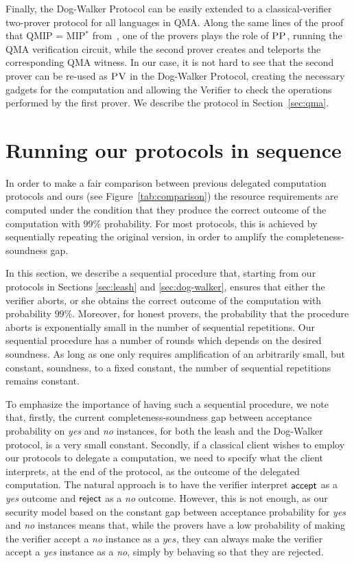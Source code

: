 Finally, the Dog-Walker Protocol can be easily extended to a classical-verifier  two-prover protocol for all languages in QMA. 
Along the same lines of the proof that QMIP = MIP$^*$ from~\cite{reichardt2012classical}, one of the provers plays the role of $\textsc{PP}$, running the  QMA verification circuit, while the second prover creates and teleports the corresponding QMA witness. In our case, it is not hard to see that the second prover can be  re-used as $\textsc{PV}$ in the Dog-Walker Protocol, creating the necessary gadgets for the computation and allowing the Verifier to check the operations performed by the first prover.  We describe the protocol in Section~\ref{sec:qma}.




\section{Running our protocols in sequence}
\label{sec:sequential}

In order to make a fair comparison between previous delegated computation protocols and ours (see Figure~\ref{tab:comparison}) the resource requirements are computed under the condition that they produce the correct outcome of the computation with $99\%$ probability. For most protocols, this is achieved by sequentially repeating the original version, in order to amplify the completeness-soundness gap. 

In this section, we describe a sequential procedure that, starting from our protocols in Sections \ref{sec:leash} and \ref{sec:dog-walker}, ensures that either the verifier aborts, or she obtains the correct outcome of the computation with probability $99\%$. Moreover, for honest provers, the probability that the procedure aborts is exponentially small in the number of sequential repetitions. Our sequential procedure has a number of rounds which depends on the desired soundness. As long as one only requires amplification of an arbitrarily small, but constant, soundness, to a fixed constant, the number of sequential repetitions remains constant.

To emphasize the importance of having such a sequential procedure, we note that, firstly, the current completeness-soundness gap between acceptance probability on \textit{yes} and \textit{no} instances, for both the leash and the Dog-Walker protocol, is a very small constant. Secondly, if a classical client wishes to employ our protocols to delegate a computation, we need to specify what the client interprets, at the end of the protocol, as the outcome of the delegated computation. The natural approach is to have the verifier interpret $\sf accept$ as a \textit{yes} outcome and $\sf reject$ as a \textit{no} outcome. However, this is not enough, as our security model based on the constant gap between acceptance probability for \textit{yes} and \textit{no} instances means that, while the provers have a low probability of making the verifier accept a \textit{no} instance as a $\textit{yes}$, they can always make the verifier accept a \textit{yes} instance as a \textit{no}, simply by behaving so that they are rejected.

